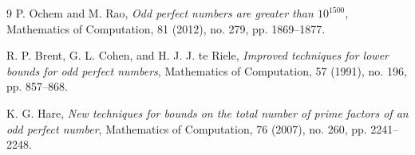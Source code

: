 \documentclass[11pt, a4paper]{article}
\begin{document}
\begin{thebibliography}{9}
P. Ochem and M. Rao, \textit{Odd perfect numbers are greater than $10^{1500}$}, Mathematics of Computation, 81 (2012), no. 279, pp. 1869--1877.

R. P. Brent, G. L. Cohen, and H. J. J. te Riele, \textit{Improved techniques for lower bounds for odd perfect numbers}, Mathematics of Computation, 57 (1991), no. 196, pp. 857--868.

K. G. Hare, \textit{New techniques for bounds on the total number of prime factors of an odd perfect number}, Mathematics of Computation, 76 (2007), no. 260, pp. 2241--2248.
\end{thebibliography}
\end{document}
